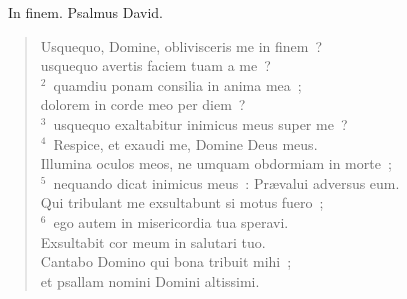 ~\lettrine[lines=10,image=true,loversize=0.05,lraise=-0.03]{I}{}n finem. Psalmus David. \begin{flushleft}\begin{verse}\vspace{6pt}Usquequo, Domine, oblivisceris me in finem~?\\ usquequo avertis faciem tuam a me~?\\
${}^{2}$~quamdiu ponam consilia in anima mea~;\\ dolorem in corde meo per diem~?\\
${}^{3}$~usquequo exaltabitur inimicus meus super me~?\\
${}^{4}$~Respice, et exaudi me, Domine Deus meus.\\ Illumina oculos meos, ne umquam obdormiam in morte~;\\
${}^{5}$~nequando dicat inimicus meus~: Pr\ae valui adversus eum.\\ Qui tribulant me exsultabunt si motus fuero~;\\
${}^{6}$~ego autem in misericordia tua speravi.\\ Exsultabit cor meum in salutari tuo.\\ Cantabo Domino qui bona tribuit mihi~;\\ et psallam nomini Domini altissimi.\end{verse}\end{flushleft}


